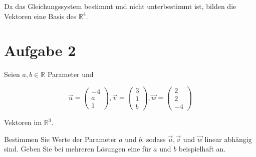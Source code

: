 Da das Gleichungssystem bestimmt und nicht unterbestimmt ist, bilden die Vektoren eine Basis des $\mathbb{R}^4$.

\section{Aufgabe 2}

Seien $a, b \in \mathbb{R}$ Parameter und 

\[
    \vec{u}= \begin{pmatrix}
        -4 \\ a \\1
    \end{pmatrix}, \vec{v} = \begin{pmatrix}
        3 \\ 1 \\ b
    \end{pmatrix}, \vec{w} = \begin{pmatrix}
        2 \\ 2 \\ -4
    \end{pmatrix}
\]

Vektoren im $\mathbb{R}^3$.

Bestimmen Sie Werte der Parameter $a$ und $b$, sodass $\vec{u}, \vec{v}$ und $\vec{w}$ linear abhängig sind. Geben Sie bei mehreren Lösungen eine für $a$ und $b$ beispielhaft an.

